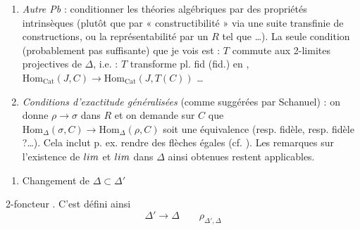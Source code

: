 \documentclass[11pt,a4paper]{article}
\begin{document}
\begin{enumerate}
  \item[(2)] \emph{Autre Pb} : conditionner les théories
    algébriques par des propriétés intrinsèques (plutôt que par
    « constructibilité » via une suite transfinie de constructions, ou
    la représentabilité par un $R$ tel que …). La seule condition
    (probablement pas suffisante) que je vois est : $T$ commute aux
    2-limites projectives de $\Delta$, i.e. : $T$ transforme
    \struck{\ill{}} pl. fid (fid.) en ,
    $\mathrm{Hom}_{\mathrm{Cat}}(J, C) \to \mathrm{Hom}_{\mathrm{Cat}}(J,
    T(C))$ …
  \item[(3)] \emph{Conditions \struck{\ill{}} d'exactitude
    généralisées} (comme suggérées par Schanuel) : on donne
    \struck{\ill{}} $\rho \to \sigma$ dans $R$ et on demande sur $C$ que
    $\mathrm{Hom}_{\Delta}(\sigma, C) \to \mathrm{Hom}_{\Delta}(\rho, C)$
    soit une équivalence (resp.  fidèle, resp. fidèle ?…).
    Cela inclut p. ex. rendre des flèches égales (cf. ). Les remarques sur l'existence de $\varprojlim$ et
    $\varinjlim$ dans $\Delta$ ainsi obtenues restent applicables.
\end{enumerate}

\begin{enumerate}
  \item[(4)] Changement de $\Delta \subset \Delta'$
\end{enumerate}


2-foncteur . C'est défini ainsi
\[
  \Delta' \to \Delta \qquad \rho_{\Delta', \Delta}
\]


\end{document}

